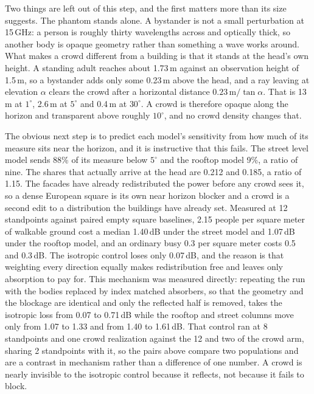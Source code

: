 Two things are left out of this step, and the first matters more than its size
suggests. The phantom stands alone. A bystander is not a small perturbation at
15\,GHz: a person is roughly thirty wavelengths across and optically thick, so
another body is opaque geometry rather than something a wave works around. What
makes a crowd different from a building is that it stands at the head's own
height. A standing adult reaches about 1.73\,m against an observation height of
1.5\,m, so a bystander adds only some 0.23\,m above the head, and a ray leaving
at elevation $\alpha$ clears the crowd after a horizontal distance
$0.23\,\mathrm{m} / \tan\alpha$. That is 13\,m at $1^\circ$, 2.6\,m at
$5^\circ$ and 0.4\,m at $30^\circ$. A crowd is therefore opaque along the
horizon and transparent above roughly $10^\circ$, and no crowd density changes
that.

The obvious next step is to predict each model's sensitivity from how much of
its measure sits near the horizon, and it is instructive that this fails. The
street level model sends 88\% of its measure below $5^\circ$ and the rooftop
model 9\%, a ratio of nine. The shares that actually arrive at the head are
0.212 and 0.185, a ratio of 1.15. The facades have already redistributed the power
before any crowd sees it, so a dense European square is its own near horizon
blocker and a crowd is a second edit to a distribution the buildings have
already set. Measured at 12 standpoints against paired empty square
baselines, 2.15 people per square meter of walkable ground cost a median
1.40\,dB under the street
model and 1.07\,dB under the rooftop model, and an ordinary busy 0.3 per square
meter costs 0.5 and 0.3\,dB. The isotropic control loses only 0.07\,dB, and
the reason is that weighting every direction equally makes redistribution free
and leaves only absorption to pay for. This mechanism was measured directly:
repeating the run with the bodies replaced by index matched absorbers, so that
the geometry and the blockage are identical and only the reflected half is
removed, takes the isotropic loss from 0.07 to 0.71\,dB while the rooftop and
street columns move only from 1.07 to 1.33 and from 1.40 to 1.61\,dB. That
control ran at 8 standpoints and one crowd realization against the 12 and two of
the crowd arm, sharing 2 standpoints with it, so the pairs above compare two
populations and are a contrast in mechanism rather than a difference of one
number. A crowd
is nearly invisible to the isotropic control because it reflects, not because it
fails to block.

